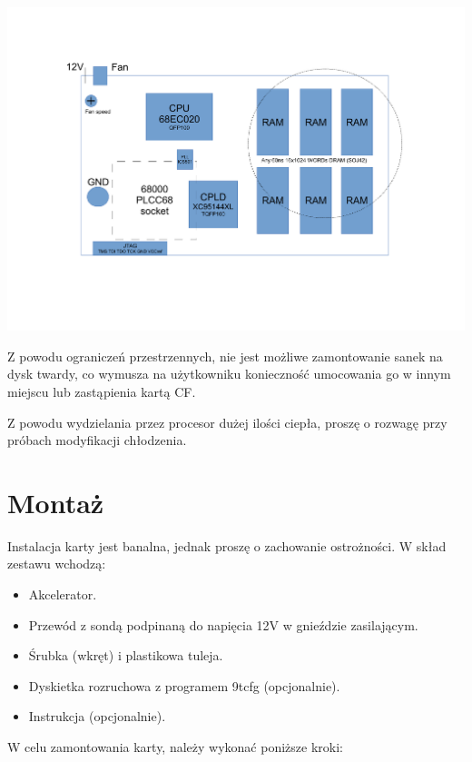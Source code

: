 \documentclass[10pt,a5paper]{article}
\begin{document}
\begin{center}
\includegraphics[scale=0.25]{ninetails-drawing.pdf}
\end{center}

Z powodu ograniczeń przestrzennych, nie jest możliwe zamontowanie sanek na dysk twardy, co wymusza na użytkowniku konieczność
umocowania go w innym miejscu lub zastąpienia kartą CF. 

Z powodu wydzielania przez procesor dużej ilości ciepła, proszę o rozwagę przy próbach modyfikacji chłodzenia.

\section*{Montaż}

Instalacja karty jest banalna, jednak proszę o zachowanie ostrożności. W skład zestawu wchodzą:

\begin{itemize}
	\item Akcelerator.
	\item Przewód z sondą podpinaną do napięcia 12V w gnieździe zasilającym.
	\item Śrubka (wkręt) i  plastikowa tuleja.
	\item Dyskietka rozruchowa z programem 9tcfg (opcjonalnie).
	\item Instrukcja (opcjonalnie).
\end{itemize}

\noindent W celu zamontowania karty, należy wykonać poniższe kroki:
\end{document}
